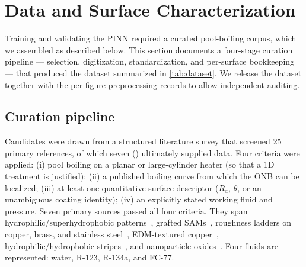 
\section{Data and Surface Characterization}\label{sec:data}

Training and validating the PINN required a curated pool-boiling
corpus, which we assembled as described below. This section
documents a four-stage curation pipeline --- selection, digitization,
standardization, and per-surface bookkeeping --- that produced the
dataset summarized in \cref{tab:dataset}. We release the dataset
together with the per-figure preprocessing records to allow
independent auditing.

\subsection{Curation pipeline}\label{subsec:curation}\label{subsec:selection}\label{subsec:digitize}\label{subsec:standardize}

Candidates were drawn from a structured literature survey that
screened \num{25} primary references, of which seven
(\citealp{betz2013,bourdon2012,bourdon2015,jabardo2009,jones2009,jo2011,phan2009})
ultimately supplied data. Four criteria were applied:
(i) pool boiling on a planar or large-cylinder heater (so that a 1D
treatment is justified);
(ii) a published boiling curve from which the ONB can be localized;
(iii) at least one quantitative surface descriptor ($R_a$, $\theta$,
or an unambiguous coating identity);
(iv) an explicitly stated working fluid and pressure.
Seven primary sources passed all four criteria. They span
hydrophilic/superhydrophobic patterns~\citep{betz2013}, grafted
SAMs~\citep{bourdon2012,bourdon2015}, roughness ladders on copper,
brass, and stainless steel~\citep{jabardo2009}, EDM-textured
copper~\citep{jones2009}, hydrophilic/hydrophobic
stripes~\citep{jo2011}, and nanoparticle oxides~\citep{phan2009}. Four
fluids are represented: water, R-123, R-134a, and FC-77.

